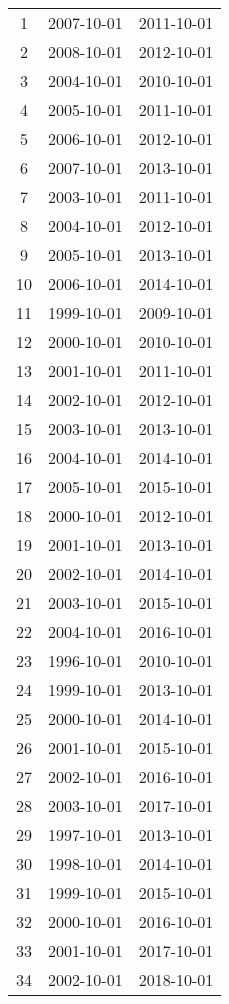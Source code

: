 % 
\begin{tabular}{ccc}
  \hline
  \hline
1 & 2007-10-01 & 2011-10-01 \\ 
  2 & 2008-10-01 & 2012-10-01 \\ 
  3 & 2004-10-01 & 2010-10-01 \\ 
  4 & 2005-10-01 & 2011-10-01 \\ 
  5 & 2006-10-01 & 2012-10-01 \\ 
  6 & 2007-10-01 & 2013-10-01 \\ 
  7 & 2003-10-01 & 2011-10-01 \\ 
  8 & 2004-10-01 & 2012-10-01 \\ 
  9 & 2005-10-01 & 2013-10-01 \\ 
  10 & 2006-10-01 & 2014-10-01 \\ 
  11 & 1999-10-01 & 2009-10-01 \\ 
  12 & 2000-10-01 & 2010-10-01 \\ 
  13 & 2001-10-01 & 2011-10-01 \\ 
  14 & 2002-10-01 & 2012-10-01 \\ 
  15 & 2003-10-01 & 2013-10-01 \\ 
  16 & 2004-10-01 & 2014-10-01 \\ 
  17 & 2005-10-01 & 2015-10-01 \\ 
  18 & 2000-10-01 & 2012-10-01 \\ 
  19 & 2001-10-01 & 2013-10-01 \\ 
  20 & 2002-10-01 & 2014-10-01 \\ 
  21 & 2003-10-01 & 2015-10-01 \\ 
  22 & 2004-10-01 & 2016-10-01 \\ 
  23 & 1996-10-01 & 2010-10-01 \\ 
  24 & 1999-10-01 & 2013-10-01 \\ 
  25 & 2000-10-01 & 2014-10-01 \\ 
  26 & 2001-10-01 & 2015-10-01 \\ 
  27 & 2002-10-01 & 2016-10-01 \\ 
  28 & 2003-10-01 & 2017-10-01 \\ 
  29 & 1997-10-01 & 2013-10-01 \\ 
  30 & 1998-10-01 & 2014-10-01 \\ 
  31 & 1999-10-01 & 2015-10-01 \\ 
  32 & 2000-10-01 & 2016-10-01 \\ 
  33 & 2001-10-01 & 2017-10-01 \\ 
  34 & 2002-10-01 & 2018-10-01 \\ 
   \hline
\end{tabular}
